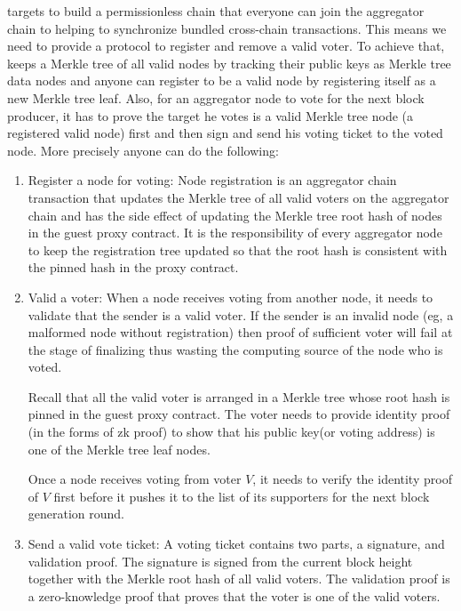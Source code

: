 \dprotocol targets to build a permissionless chain that everyone can join the aggregator chain to helping to synchronize bundled cross-chain transactions. This means we need to provide a protocol to register and remove a valid voter. To achieve that, \dprotocol keeps a Merkle tree of all valid nodes by tracking their public keys as Merkle tree data nodes and anyone can register to be a valid node by registering itself as a new Merkle tree leaf. Also, for an aggregator node to vote for the next block producer, it has to prove the target he votes is a valid Merkle tree node (a registered valid node) first and then sign and send his voting ticket to the voted node. More precisely anyone can do the following:
\begin{enumerate}[leftmargin=*]
\item Register a node for voting:
    Node registration is an aggregator chain transaction that updates the Merkle tree of all valid voters on the aggregator chain and has the side effect of updating the Merkle tree root hash of nodes in the guest proxy contract. It is the responsibility of every aggregator node to keep the registration tree updated so that the root hash is consistent with the pinned hash in the proxy contract. 

\item Valid a voter:
    When a node receives voting from another node, it needs to validate that the sender is a valid voter. If the sender is an invalid node (eg, a malformed node without registration) then proof of sufficient voter will fail at the stage of finalizing thus wasting the computing source of the node who is voted.

    Recall that all the valid voter is arranged in a Merkle tree whose root hash is pinned in the guest proxy contract. The voter needs to provide identity proof (in the forms of zk proof) to show that his public key(or voting address) is one of the Merkle tree leaf nodes.
    
    Once a node receives voting from voter $V$, it needs to verify the identity proof of $V$ first before it pushes it to the list of its supporters for the next block generation round.

\item Send a valid vote ticket:
    A voting ticket contains two parts, a signature, and validation proof. The signature is signed from the current block height together with the Merkle root hash of all valid voters. The validation proof is a zero-knowledge proof that proves that the voter is one of the valid voters. 
\end{enumerate}

